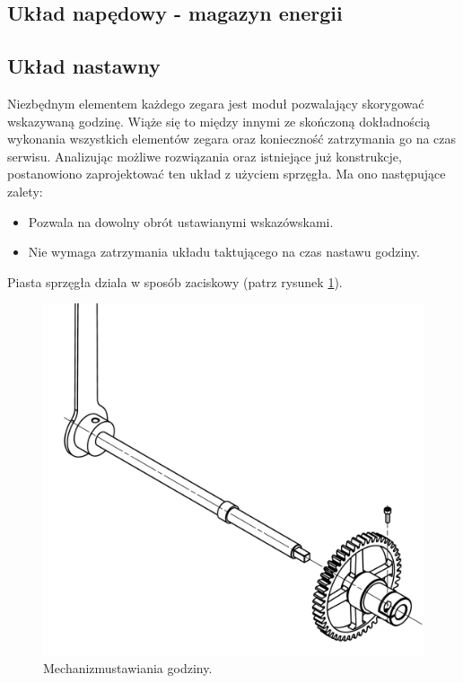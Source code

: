         \subsection{Układ napędowy - magazyn energii}
        	
        \subsection{Układ nastawny}
        Niezbędnym elementem każdego zegara jest moduł pozwalający skorygować wskazywaną godzinę.
        Wiąże się to między innymi ze skończoną dokładnością wykonania wszystkich elementów zegara oraz konieczność zatrzymania go na czas serwisu.
        Analizując możliwe rozwiązania oraz istniejące już konstrukcje, postanowiono zaprojektować ten układ z użyciem sprzęgła.
        Ma ono następujące zalety:
        \begin{itemize}
        	\item Pozwala na dowolny obrót ustawianymi wskazówskami.
        	\item Nie wymaga zatrzymania układu taktującego na czas nastawu godziny.
        \end{itemize}
		Piasta sprzęgła dziala w sposób zaciskowy (patrz rysunek \ref{fig:szpeglo}).
		
		\begin{figure}
			\centering
			\includegraphics[width=0.8\linewidth]{Projekt/szpeglo}
			\caption{Mechanizmustawiania godziny.}
			\label{fig:szpeglo}
		\end{figure}
		
    	

